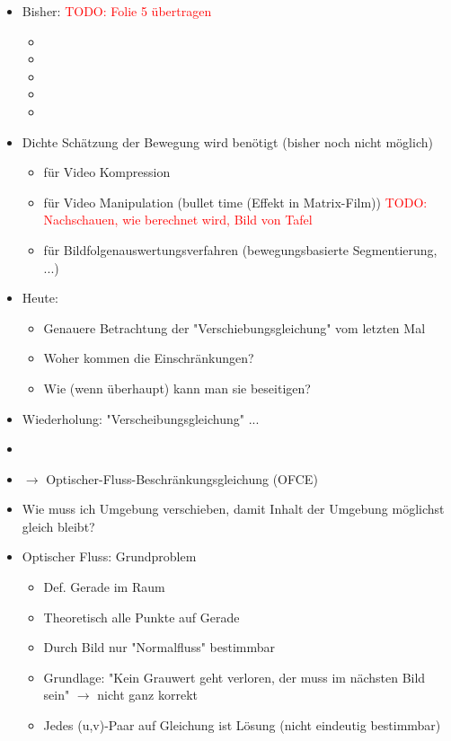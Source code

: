 \documentclass{report}
\newcommand{\todo}[2][red]{\textcolor{#1}{TODO: #2}}
\begin{document}
	\begin{itemize}
		\item Bisher: \todo{Folie 5 übertragen}
		\begin{itemize}
			\item 
			\item 
			\item 
			\item 
			\item 
		\end{itemize}
	
		\item Dichte Schätzung der Bewegung wird benötigt (bisher noch nicht möglich)
		\begin{itemize}
			\item für Video Kompression
			\item für Video Manipulation (bullet time (Effekt in Matrix-Film))
			\newline \todo{Nachschauen, wie berechnet wird, Bild von Tafel} %
			\item für Bildfolgenauswertungsverfahren (bewegungsbasierte Segmentierung, ...)
		\end{itemize}
		
		\item Heute:
		\begin{itemize}
			\item Genauere Betrachtung der "Verschiebungsgleichung" vom letzten Mal
			\item Woher kommen die Einschränkungen?
			\item Wie (wenn überhaupt) kann man sie beseitigen?
		\end{itemize}
		
		\item Wiederholung: "Verscheibungsgleichung" ...
		\item 
		\item $\rightarrow$ Optischer-Fluss-Beschränkungsgleichung (OFCE)
		
		\item Wie muss ich Umgebung verschieben, damit Inhalt der Umgebung möglichst gleich bleibt?
		
		\item Optischer Fluss: Grundproblem
		\begin{itemize}
			\item Def. Gerade im Raum
			\item Theoretisch alle Punkte auf Gerade
			\item Durch Bild nur "Normalfluss" bestimmbar
			\item Grundlage: "Kein Grauwert geht verloren, der muss im nächsten Bild sein"
			\newline $\rightarrow$ nicht ganz korrekt
			\item Jedes (u,v)-Paar auf Gleichung ist Lösung (nicht eindeutig bestimmbar)
		\end{itemize}
	

\end{itemize}
\end{document}
